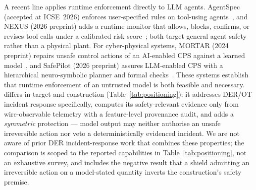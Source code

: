 A recent line applies runtime enforcement directly to LLM agents.
AgentSpec (accepted at ICSE~2026) enforces user-specified rules on
tool-using agents~\cite{Wang2025AgentSpec}, and NEXUS (2026 preprint)
adds a runtime monitor that allows, blocks, confirms, or revises tool
calls under a calibrated risk score~\cite{Hossain2026NEXUS}; both target
general agent safety rather than a physical plant. For cyber-physical
systems, MORTAR (2024 preprint) repairs unsafe control actions of an
AI-enabled CPS against a learned model~\cite{Wang2024MORTAR}, and
SafePilot (2026 preprint) assures LLM-enabled CPS with a hierarchical
neuro-symbolic planner and formal checks~\cite{Xu2026SafePilot}. These
systems establish that runtime enforcement of an untrusted model is both
feasible and necessary. \ours{} differs in target and construction
(Table~\ref{tab:positioning}): it addresses DER/OT incident response
specifically, computes its safety-relevant evidence only from
wire-observable telemetry with a feature-level provenance audit, and adds
a \emph{symmetric} protection --- model output may neither authorise an
unsafe irreversible action nor veto a deterministically evidenced
incident. We are not aware of prior DER incident-response work that
combines these properties; the comparison is scoped to the reported
capabilities in Table~\ref{tab:positioning}, not an exhaustive survey,
and includes the negative result that a shield admitting an irreversible
action on a model-stated quantity inverts the construction's safety
premise.

